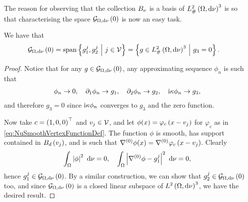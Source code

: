 The reason for observing that the collection $B_{\nu}$ is a basis of $L^2_{\#}\left( \Omega,\mathrm{d} \nu \right)^3$ is so that characterising the space $\mathcal{G}_{ \Omega, \mathrm{d}\nu}\left( 0 \right)$ is now an easy task.
\begin{prop} \label{prop:NuGradZeroChar}
	We have that 
	\begin{align*}
		\mathcal{G}_{ \Omega, \mathrm{d}\nu}\left( 0 \right) &= \mathrm{span}\left\{ g_1^j, g_2^j \ \middle\vert \  j\in\mathcal{V}  \right\}
		= \left\{  g\in L^2_{\#}\left( \Omega,\mathrm{d} \nu \right)^3 \ \middle\vert \  g_3 = 0 \right\}.
	\end{align*}
\end{prop}
\begin{proof}
	Notice that for any $g\in\mathcal{G}_{ \Omega, \mathrm{d}\nu}\left( 0 \right)$, any approximating sequence $\phi_n$ is such that
	\begin{align*}
		\phi_n \rightarrow 0, \quad \partial_1\phi_n \rightarrow g_1, 
		\quad \partial_2\phi_n\rightarrow g_2, \quad \mathrm{i}\kappa\phi_n \rightarrow g_3,
	\end{align*}
	and therefore $g_3 = 0$ since $\mathrm{i}\kappa\phi_n$ converges to $g_3$ and the zero function.
	
	Now take $c=\left( 1,0,0 \right)^\top$ and $v_j\in\mathcal{V}$, and let $\phi(x) = \varphi_c\left( x-v_j \right)$ for $\varphi_c$ as in \eqref{eq:NuSmoothVertexFunctionDef}.
	The function $\phi$ is smooth, has support contained in $B_d\left( v_j \right)$, and is such that $\nabla^{(0)}\phi(x) = \nabla^{(0)}\varphi_c\left( x-v_j \right)$.
	Clearly
	\begin{align*}
		\int_{\Omega}\left\lvert \phi \right\rvert^2 \ \mathrm{d}\nu = 0, \quad
		\int_{\Omega}\left\lvert \nabla^{(0)}\phi - g_1^j \right\rvert^2 \ \mathrm{d}\nu = 0,
	\end{align*}
	hence $g_1^j\in\mathcal{G}_{ \Omega, \mathrm{d}\nu}\left( 0 \right)$.
	By a similar construction, we can show that $g_2^j\in\mathcal{G}_{ \Omega, \mathrm{d}\nu}\left( 0 \right)$ too, and since $\mathcal{G}_{ \Omega, \mathrm{d}\nu}\left( 0 \right)$ is a closed linear subspace of $L^{2}\left( \Omega,\mathrm{d} \nu \right)^3$, we have the desired result.
\end{proof}

